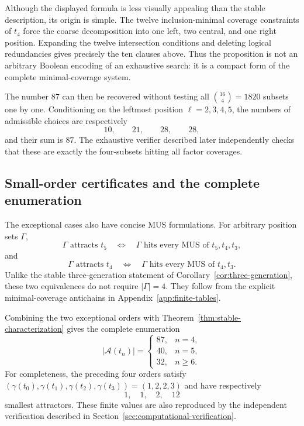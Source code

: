 \documentclass[10pt,a4paper]{article}
\theoremstyle{definition}\newtheorem{definition}[theorem]{Definition}
\theoremstyle{remark}\newtheorem{remark}[theorem]{Remark}
\newcommand{\Acal}{\mathcal{A}}
\begin{document}
Although the displayed formula is less visually appealing than the stable description, its origin is simple.  The twelve inclusion-minimal coverage constraints of $t_4$ force the coarse decomposition into one left, two central, and one right position.  Expanding the twelve intersection conditions and deleting logical redundancies gives precisely the ten clauses above.  Thus the proposition is not an arbitrary Boolean encoding of an exhaustive search: it is a compact form of the complete minimal-coverage system.

The number $87$ can then be recovered without testing all $\binom{16}{4}=1820$ subsets one by one.  Conditioning on the leftmost position $\ell=2,3,4,5$, the numbers of admissible choices are respectively
\[
 10,\qquad21,\qquad28,\qquad28,
\]
and their sum is $87$.  The exhaustive verifier described later independently checks that these are exactly the four-subsets hitting all factor coverages.

\subsection{Small-order certificates and the complete enumeration}
\label{subsec:exceptional-certificates}

The exceptional cases also have concise MUS formulations.  For arbitrary position sets $\Gamma$,
\[
 \Gamma\text{ attracts }t_5
 \quad\Longleftrightarrow\quad
 \Gamma\text{ hits every MUS of }t_5,t_4,t_3,
\]
and
\[
 \Gamma\text{ attracts }t_4
 \quad\Longleftrightarrow\quad
 \Gamma\text{ hits every MUS of }t_4,t_3.
\]
Unlike the stable three-generation statement of Corollary~\ref{cor:three-generation}, these two equivalences do not require $|\Gamma|=4$.  They follow from the explicit minimal-coverage antichains in Appendix~\ref{app:finite-tables}.

Combining the two exceptional orders with Theorem~\ref{thm:stable-characterization} gives the complete enumeration
\[
 |\Acal(t_n)|=
 \begin{cases}
 87,&n=4,\\
 40,&n=5,\\
 32,&n\ge6.
 \end{cases}
\]
For completeness, the preceding four orders satisfy
$
(\gamma(t_0),\gamma(t_1),\gamma(t_2),\gamma(t_3))=(1,2,2,3)
$
and have respectively
\[
 1,\quad1,\quad2,\quad12
\]
smallest attractors.  These finite values are also reproduced by the independent verification described in Section~\ref{sec:computational-verification}.
\end{document}
